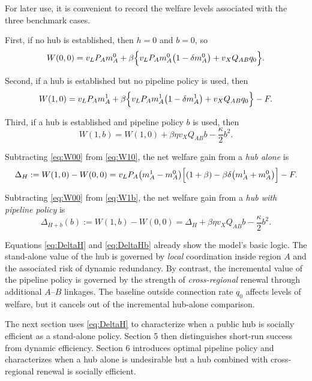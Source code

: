 For later use, it is convenient to record the welfare levels associated with the three benchmark cases.

First, if no hub is established, then $h=0$ and $b=0$, so
\begin{equation}
W(0,0)
=
v_L P_A m_A^0
+
\beta\Bigl\{v_L P_A m_A^0\bigl(1-\delta m_A^0\bigr) + v_X Q_{AB} q_0\Bigr\}.
\label{eq:W00}
\end{equation}

Second, if a hub is established but no pipeline policy is used, then
\begin{equation}
W(1,0)
=
v_L P_A m_A^1
+
\beta\Bigl\{v_L P_A m_A^1\bigl(1-\delta m_A^1\bigr) + v_X Q_{AB} q_0\Bigr\}
-F.
\label{eq:W10}
\end{equation}

Third, if a hub is established and pipeline policy $b$ is used, then
\begin{equation}
W(1,b)
=
W(1,0)
+
\beta\eta v_X Q_{AB} b
-
\frac{\kappa}{2}b^2.
\label{eq:W1b}
\end{equation}

Subtracting \eqref{eq:W00} from \eqref{eq:W10}, the net welfare gain from a \emph{hub alone} is
\begin{equation}
\Delta_H
:=
W(1,0)-W(0,0)
=
v_L P_A \bigl(m_A^1-m_A^0\bigr)\Bigl[(1+\beta)-\beta\delta\bigl(m_A^1+m_A^0\bigr)\Bigr]-F.
\label{eq:DeltaH}
\end{equation}

Subtracting \eqref{eq:W00} from \eqref{eq:W1b}, the net welfare gain from a \emph{hub with pipeline policy} is
\begin{equation}
\Delta_{H+b}(b)
:=
W(1,b)-W(0,0)
=
\Delta_H
+
\beta\eta v_X Q_{AB} b
-
\frac{\kappa}{2}b^2.
\label{eq:DeltaHb}
\end{equation}

Equations \eqref{eq:DeltaH} and \eqref{eq:DeltaHb} already show the model's basic logic. The stand-alone value of the hub is governed by \emph{local} coordination inside region $A$ and the associated risk of dynamic redundancy. By contrast, the incremental value of the pipeline policy is governed by the strength of \emph{cross-regional} renewal through additional $A$--$B$ linkages. The baseline outside connection rate $q_0$ affects levels of welfare, but it cancels out of the incremental hub-alone comparison.

The next section uses \eqref{eq:DeltaH} to characterize when a public hub is socially efficient as a stand-alone policy. Section 5 then distinguishes short-run success from dynamic efficiency. Section 6 introduces optimal pipeline policy and characterizes when a hub alone is undesirable but a hub combined with cross-regional renewal is socially efficient.

